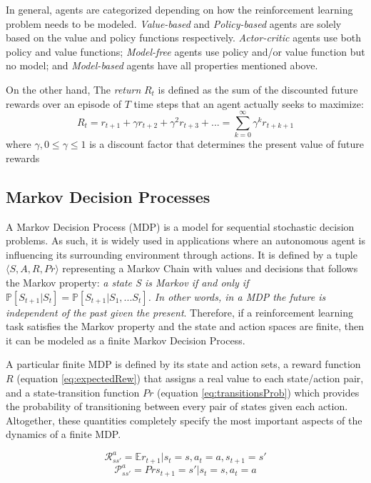 In general, agents are categorized depending on how the reinforcement learning problem needs to be modeled. \textit{Value-based} and \textit{Policy-based} agents are solely based on the value and policy functions respectively. \textit{Actor-critic} agents use both policy and value functions; \textit{Model-free} agents use policy and/or value function but no model; and \textit{Model-based} agents have all properties mentioned above.

On the other hand, The \textit{return} $R_t$ is defined as the sum of the discounted future rewards over an episode of $T$ time steps that an agent actually seeks to maximize:
\begin{equation}
\label{eq:return}
R_t = r_{t+1} + \gamma r_{t+2} + \gamma^2 r_{t+3} + ... = \sum^{\infty}_{k=0} \gamma^k r_{t+k+1}
\end{equation}
where $\gamma, 0 \leq \gamma \leq 1$ is a discount factor that determines the present value of future rewards

\subsection{Markov Decision Processes}

A Markov Decision Process (MDP) is a model for sequential stochastic decision problems. As such, it is widely used in applications where an autonomous agent is influencing its surrounding environment through actions\cite{shani2005mdp}. It is defined by a tuple $\langle S, A, R, Pr \rangle$ representing a Markov Chain with values and decisions that follows the Markov property: \textit{a state S is Markov if and only if $\mathbb{P}[S_{t+1}|S_t] = \mathbb{P}[S_{t+1}|S_1,...S_t]$. In other words, in a MDP the future is independent of the past given the present}. Therefore, if a reinforcement learning task satisfies the Markov property and the state and action spaces are finite, then it can be modeled as a finite Markov Decision Process.

A particular finite MDP is defined by its state and action sets, a reward function $R$ (equation \ref{eq:expectedRew}) that assigns a real value to each state/action pair, and a state-transition function $Pr$ (equation \ref{eq:transitionsProb}) which provides the probability of transitioning between every pair of states given each action. Altogether, these quantities completely specify the most important aspects of the dynamics of a finite MDP.

\begin{equation}
\label{eq:expectedRew}
\mathcal{R}^a_{ss'} = \mathbb{E} {r_{t+1} | s_t=s, a_t=a, s_{t+1}=s'}
\end{equation}
\begin{equation}
\label{eq:transitionsProb}
\mathcal{P}^a_{ss'} = Pr {s_{t+1} = s' | s_t=s, a_t=a}
\end{equation}

